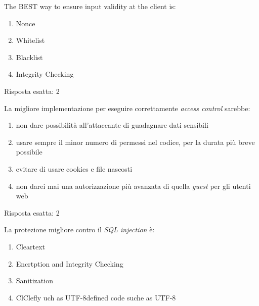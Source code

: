 \begin{Exercise} [
  title={Quiz},
  label={esControlli5}
  ]

  \Question The BEST way to ensure input validity at the client is:
  \begin{enumerate}
\item Nonce
\item Whitelist
\item Blacklist
\item Integrity Checking
\end{enumerate}
  

\end{Exercise}

\begin{Answer} [
  ref={esControlli5},
  number={5}
  ]

  \Question Risposta esatta: 2
\end{Answer}


\begin{Exercise} [
  title={Quiz},
  label={esControlli6}
  ]

  \Question La migliore implementazione per eseguire correttamente 
\textit{access control} sarebbe:
\begin{enumerate}
 \item non dare possibilità all'attaccante di guadagnare dati sensibili
 \item usare sempre il minor numero di permessi nel codice, per la durata più 
breve possibile
 \item evitare di usare cookies e file nascosti
 \item non darei mai una autorizzazione più avanzata di quella \textit{guest} 
per gli utenti web
\end{enumerate}

\end{Exercise}

\begin{Answer} [
  ref={esControlli6},
  number={6}
  ]

  \Question Risposta esatta: 2
\end{Answer}


\begin{Exercise} [
  title={Quiz},
  label={esControlli7}
  ]

  \Question La protezione migliore contro il \textit{SQL injection} è:
  \begin{enumerate}
    \item Cleartext
    \item Encrtption and Integrity Checking
    \item Sanitization
    \item ClClefly uch as UTF-8defined code suche as UTF-8
  \end{enumerate}
\end{Exercise}

